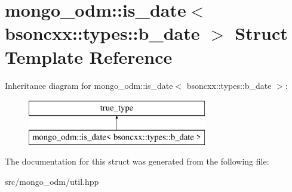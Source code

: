 \hypertarget{structmongo__odm_1_1is__date_3_01bsoncxx_1_1types_1_1b__date_01_4}{}\section{mongo\+\_\+odm\+:\+:is\+\_\+date$<$ bsoncxx\+:\+:types\+:\+:b\+\_\+date $>$ Struct Template Reference}
\label{structmongo__odm_1_1is__date_3_01bsoncxx_1_1types_1_1b__date_01_4}
Inheritance diagram for mongo\+\_\+odm\+:\+:is\+\_\+date$<$ bsoncxx\+:\+:types\+:\+:b\+\_\+date $>$\+:\begin{figure}[H]
\begin{center}
\leavevmode
\includegraphics[height=2.000000cm]{structmongo__odm_1_1is__date_3_01bsoncxx_1_1types_1_1b__date_01_4}
\end{center}
\end{figure}


The documentation for this struct was generated from the following file\+:\begin{DoxyCompactItemize}
\item 
src/mongo\+\_\+odm/util.\+hpp\end{DoxyCompactItemize}
